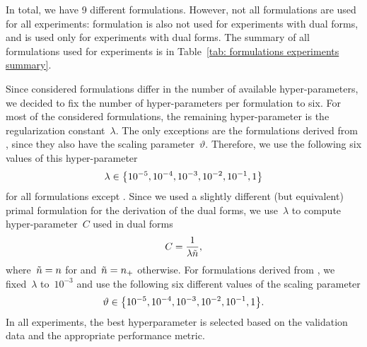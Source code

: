 In total, we have 9 different formulations. However, not all formulations are used for all experiments: \BaseLine formulation is also not used for experiments with dual forms, and \SVM is used only for experiments with dual forms. The summary of all formulations used for experiments is in Table~\ref{tab: formulations experiments summary}.

Since considered formulations differ in the number of available hyper-parameters, we decided to fix the number of hyper-parameters per formulation to six. For most of the considered formulations, the remaining hyper-parameter is the regularization constant~$\lambda$. The only exceptions are the formulations derived from \PatMatNP, since they also have the scaling parameter~$\vartheta.$ Therefore, we use the following six values of this hyper-parameter
\begin{equation*}
  \lambda \in \Brac[c]{10^{-5}, 10^{-4}, 10^{-3}, 10^{-2}, 10^{-1}, 1}
\end{equation*}
for all formulations except \PatMatNP. Since we used a slightly different (but equivalent) primal formulation for the derivation of the dual forms, we use~$\lambda$ to compute hyper-parameter~$C$ used in dual forms
\begin{equation*}
  C = \frac{1}{\lambda \tilde{n}},
\end{equation*}
where~$\tilde{n} = n$ for \SVM and~$\tilde{n} = n_{+}$ otherwise. For formulations derived from \PatMatNP, we fixed~$\lambda$ to~$10^{-3}$ and use the following six different values of the scaling parameter
\begin{equation*}
  \vartheta \in \Brac[c]{10^{-5}, 10^{-4}, 10^{-3}, 10^{-2}, 10^{-1}, 1}.
\end{equation*}
In all experiments, the best hyperparameter is selected based on the validation data and the appropriate performance metric.

